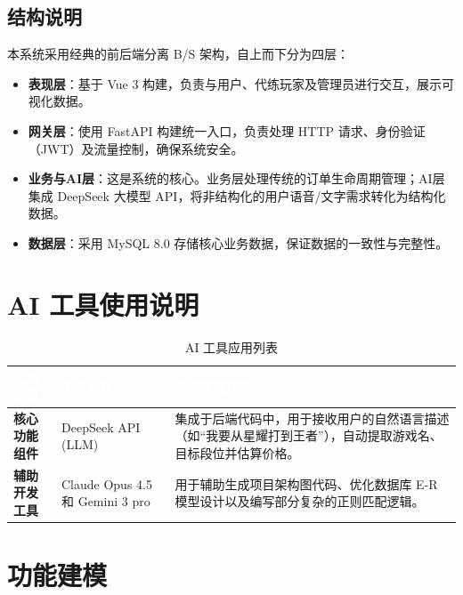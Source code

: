 \documentclass[12pt,a4paper]{article}
\begin{document}
\subsection{结构说明}
本系统采用经典的前后端分离 B/S 架构，自上而下分为四层：
\begin{itemize}
    \item \textbf{表现层}：基于 Vue 3 构建，负责与用户、代练玩家及管理员进行交互，展示可视化数据。
    \item \textbf{网关层}：使用 FastAPI 构建统一入口，负责处理 HTTP 请求、身份验证（JWT）及流量控制，确保系统安全。
    \item \textbf{业务与AI层}：这是系统的核心。业务层处理传统的订单生命周期管理；AI层集成 DeepSeek 大模型 API，将非结构化的用户语音/文字需求转化为结构化数据。
    \item \textbf{数据层}：采用 MySQL 8.0 存储核心业务数据，保证数据的一致性与完整性。
\end{itemize}

\section{AI 工具使用说明}

\begin{table}[H]
\centering
\renewcommand{\arraystretch}{1.5}
\begin{tabularx}{\textwidth}{|l|l|X|}
\hline
\rowcolor{headerblue}
\textcolor{white}{\textbf{工具类型}} & \textcolor{white}{\textbf{工具名称}} & \textcolor{white}{\textbf{具体使用方式}} \\
\hline
\textbf{核心功能组件} & DeepSeek API (LLM) & 集成于后端代码中，用于接收用户的自然语言描述（如“我要从星耀打到王者”），自动提取游戏名、目标段位并估算价格。 \\
\hline
\textbf{辅助开发工具} & Claude Opus 4.5 和 Gemini 3 pro  & 用于辅助生成项目架构图代码、优化数据库 E-R 模型设计以及编写部分复杂的正则匹配逻辑。 \\
\hline
\end{tabularx}
\caption{AI 工具应用列表}
\end{table}

\section{功能建模}
\end{document}
